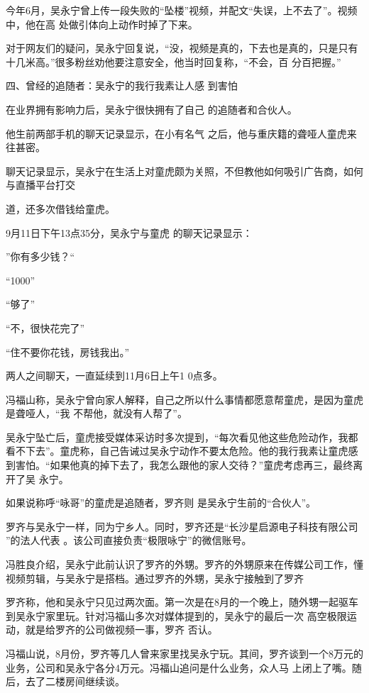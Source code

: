 \documentclass{article}
\begin{document}
\newpage

今年6月，吴永宁曾上传一段失败的“坠楼”视频，并配文“失误，上不去了”。视频中，他在高
处做引体向上动作时掉了下来。 

对于网友们的疑问，吴永宁回复说，“没，视频是真的，下去也是真的，只是只有十几米高。”很多粉丝劝他要注意安全，他当时回复称，“不会，百
分百把握。” 

四、曾经的追随者：吴永宁的我行我素让人感
到害怕 

在业界拥有影响力后，吴永宁很快拥有了自己
的追随者和合伙人。 

他生前两部手机的聊天记录显示，在小有名气
之后，他与重庆籍的聋哑人童虎来往甚密。 

聊天记录显示，吴永宁在生活上对童虎颇为关照，不但教他如何吸引广告商，如何与直播平台打交

\newpage
道，还多次借钱给童虎。 

9月11日下午13点35分，吴永宁与童虎
的聊天记录显示： 


”你有多少钱？“ 


“1000” 


“够了” 


“不，很快花完了” 


“住不要你花钱，房钱我出。” 

两人之间聊天，一直延续到11月6日上午1
0点多。 

冯福山称，吴永宁曾向家人解释，自己之所以什么事情都愿意帮童虎，是因为童虎是聋哑人，“我
不帮他，就没有人帮了”。 

\newpage

吴永宁坠亡后，童虎接受媒体采访时多次提到，“每次看见他这些危险动作，我都看不下去”。童虎称，自己告诫过吴永宁动作不要太危险。他的我行我素让童虎感到害怕。“如果他真的掉下去了，我怎么跟他的家人交待？”童虎考虑再三，最终离开了吴
永宁。 

如果说称呼“咏哥”的童虎是追随者，罗齐则
是吴永宁生前的“合伙人”。 

罗齐与吴永宁一样，同为宁乡人。同时，罗齐还是“长沙星启源电子科技有限公司 ”的法人代表
。该公司直接负责“极限咏宁”的微信账号。 

冯胜良介绍，吴永宁此前认识了罗齐的外甥。罗齐的外甥原来在传媒公司工作，懂视频剪辑，与吴永宁是搭档。通过罗齐的外甥，吴永宁接触到了罗齐

罗齐称，他和吴永宁只见过两次面。第一次是在8月的一个晚上，随外甥一起驱车到吴永宁家里玩。针对冯福山多次对媒体提到的，吴永宁的最后一次
\newpage
高空极限运动，就是给罗齐的公司做视频一事，罗齐
否认。 

冯福山说，8月份，罗齐等几人曾来家里找吴永宁玩。其间，罗齐谈到一个8万元的业务，公司和吴永宁各分4万元。冯福山追问是什么业务，众人马
上闭上了嘴。随后，去了二楼房间继续谈。 
\end{document}
